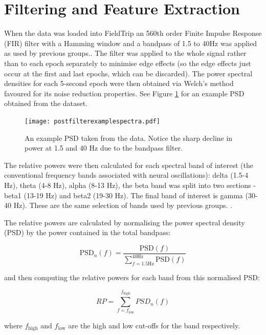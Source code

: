 \section{Filtering and Feature Extraction}

When the data was loaded into FieldTrip an 560th order Finite Impulse Response (FIR) filter with a Hamming window and a bandpass of 1.5 to 40Hz was applied as used by previous groups.\cite{Gomez2013}. The filter was applied to the whole signal rather than to each epoch separately to minimise edge effects (so the edge effects just occur at the first and last epochs, which can be discarded). The power spectral densities for each 5-second epoch were then obtained via Welch's method\cite{Welch1967} favoured for its noise reduction properties. See Figure \ref{fig:spectra} for an example PSD obtained from the dataset.


\begin{figure}[h!]
  \centering
    \texttt{[image: postfilterexamplespectra.pdf]}
    \caption{An example PSD taken from the data. Notice the sharp decline in power at 1.5 and 40 Hz due to the bandpass filter.}
    \label{fig:spectra}
\end{figure}

The relative powers were then calculated for each spectral band of interest (the conventional frequency bands associated with neural oscillations): delta (1.5-4 Hz), theta (4-8 Hz), alpha (8-13 Hz), the beta band was split into two sections - beta1 (13-19 Hz) and beta2 (19-30 Hz). The final band of interest is gamma (30-40 Hz). These are the same selection of bands used by previous groups. \cite{Gomez2013}. 

The relative powers are calculated by normalising the power spectral density (PSD) by the power contained in the total bandpass\cite{Escudero2013}:

\begin{equation} \textrm{PSD}_n(f)=\frac{\textrm{PSD}(f)}{\sum\limits^{40 \textrm{Hz}}_{f=1.5\textrm{Hz}} \textrm{PSD}(f) }   \end{equation}

and then computing the relative powers for each band from this normalised PSD:

\begin{equation} RP = \sum\limits^{f_{\textrm{high}}}_{f=f_{\textrm{low}}} PSD_n (f) \end{equation}

where $f_{\textrm{high}}$ and $f_{\textrm{low}}$ are the high and low cut-offs for the band respectively.

